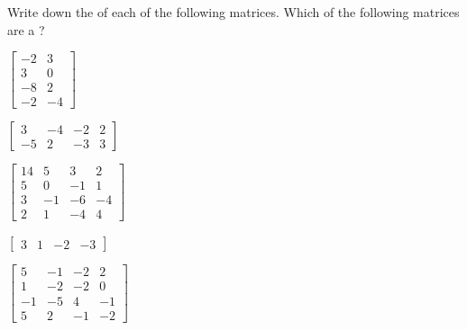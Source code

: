 \begin{exercise} \label{ex:} 
Write down the  of each of the following matrices.
Which of the following matrices are a ?
\begin{parts}
\item \(\begin{bmatrix} -2&3
\\3&0
\\-8&2
\\-2&-4 \end{bmatrix}\)

\item \(\begin{bmatrix} 3&-4&-2&2
\\-5&2&-3&3 \end{bmatrix}\)

\item \(\begin{bmatrix} 14&5&3&2 
\\5&0&-1&1 
\\3&-1&-6&-4
\\2&1&-4&4 \end{bmatrix}\)

\item \(\begin{bmatrix} 3&1&-2&-3 \end{bmatrix}\)

\item \(\begin{bmatrix} 5&-1&-2&2
\\1&-2&-2&0
\\-1&-5&4&-1
\\5&2&-1&-2 \end{bmatrix}\)


\end{parts}
\end{exercise}
